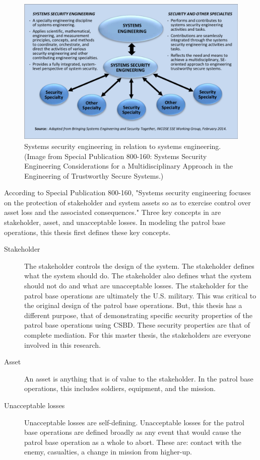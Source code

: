 \documentclass[../../main/main.tex]{subfiles}
\begin{document}
\begin{figure}[h]
\includegraphics[width=\linewidth]{../figures/seincontext.png}
\caption{\label{fig:nist800160}Systems security engineering in relation to systems engineering. (Image from  Special Publication 800-160: Systems Security Engineering Considerations for a Multidisciplinary Approach in the Engineering of Trustworthy Secure Systems.)}
\end{figure}

According to  Special Publication 800-160, "Systems security engineering focuses on the protection of stakeholder and system assets so as to exercise control over asset loss and the associated consequences."  Three key concepts in  are stakeholder, asset, and unacceptable losses.  In modeling the patrol base operations, this thesis first defines these key concepts.  

\begin{description}
\item[ Stakeholder]  The stakeholder controls the design of the system.  The stakeholder defines what the system should do.  The stakeholder also defines what the system should not do and what are unacceptable losses.  The stakeholder for the patrol base operations are ultimately the U.S. military.  This was critical to the original design of the patrol base operations.  But, this thesis has a different purpose, that of demonstrating specific security properties of the patrol base operations using CSBD.  These security properties are that of complete mediation.  For this master thesis, the stakeholders are everyone involved in this research.  
\item[Asset] An asset is anything that is of value to the stakeholder.   In the patrol base operations, this includes soldiers, equipment, and the mission.
\item[Unacceptable losses] Unacceptable losses are self-defining.  Unacceptable losses for the patrol base operations are defined broadly as any event that would cause the patrol base operation as a whole to abort.  These are: contact with the enemy, casualties, a change in mission from higher-up.
\end{description}
\end{document}
